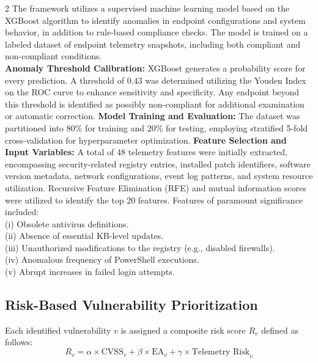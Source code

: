 \documentclass[10pt]{article} %
\begin{document}
\begin{multicols}{2}
The framework utilizes a supervised machine learning model based on the XGBoost algorithm to identify anomalies in endpoint configurations and system behavior, in addition to rule-based compliance checks. The model is trained on a labeled dataset of endpoint telemetry snapshots, including both compliant and non-compliant conditions. \\
\newline \textbf{Anomaly Threshold Calibration:} 
XGBoost generates a probability score for every prediction. A threshold of 0.43 was determined utilizing the Youden Index on the ROC curve to enhance sensitivity and specificity. Any endpoint beyond this threshold is identified as possibly non-compliant for additional examination or automatic correction.
\newline \textbf{Model Training and Evaluation:} 
The dataset was partitioned into 80\% for training and 20\% for testing, employing stratified 5-fold cross-validation for hyperparameter optimization. 
\newline \textbf{Feature Selection and Input Variables:} 
A total of 48 telemetry features were initially extracted, encompassing security-related registry entries, installed patch identifiers, software version metadata, network configurations, event log patterns, and system resource utilization. Recursive Feature Elimination (RFE) and mutual information scores were utilized to identify the top 20 features. Features of paramount significance included:
\\
    (i) Obsolete antivirus definitions. \\
    (ii) Absence of essential KB-level updates. \\
    (iii) Unauthorized modifications to the registry (e.g., disabled firewalls).  \\
    (iv) Anomalous frequency of PowerShell executions. \\
    (v) Abrupt increases in failed login attempts.

\subsection{Risk-Based Vulnerability Prioritization}

Each identified vulnerability \( v \) is assigned a composite risk score \( R_v \) defined as follows:
\begin{equation}
\label{eq:1}
R_v = \alpha \times \text{CVSS}_v + \beta \times \text{EA}_v + \gamma \times \text{Telemetry Risk}_v
\end{equation}


\end{multicols}
\end{document}
